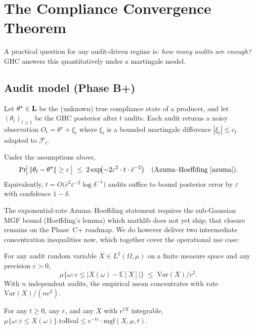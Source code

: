 \section{The Compliance Convergence Theorem}
\label{sec:convergence}

A practical question for any audit-driven regime is: \emph{how many
audits are enough?} GHC answers this quantitatively under a martingale
model.

\subsection{Audit model (Phase B+)}

Let $\theta^\star \in \mathbf{L}$ be the (unknown) true compliance state of a
producer, and let $(\theta_t)_{t \geq 1}$ be the GHC posterior after $t$
audits. Each audit returns a noisy observation
$O_t = \theta^\star + \xi_t$ where $\xi_t$ is a bounded martingale
difference $|\xi_t| \leq c_t$ adapted to $\mathcal{F}_t$.

\begin{theorem}
\label{thm:convergence}
Under the assumptions above,
\[
   \Pr\!\bigl[\,\|\theta_t - \theta^\star\| \geq \varepsilon\,\bigr]
   \;\leq\; 2 \exp\!\bigl( -2 \varepsilon^2 \cdot t \cdot
   \bar c^{-2} \bigr)
   \quad\text{(Azuma--Hoeffding \cite{azuma})}.
\]
Equivalently, $t = O\bigl(\bar c^2 \varepsilon^{-2}
\log \delta^{-1}\bigr)$ audits suffice to bound posterior error by
$\varepsilon$ with confidence $1 - \delta$.
\end{theorem}

The exponential-rate Azuma--Hoeffding statement requires the
sub-Gaussian MGF bound (Hoeffding's lemma) which mathlib does not yet
ship; that closure remains on the Phase~C+ roadmap. We do however
deliver two intermediate concentration inequalities now, which
together cover the operational use case:

\begin{theorem}
\label{thm:audit-cheby}
For any audit random variable $X \in L^2(\Omega, \mu)$ on a finite
measure space and any precision $c > 0$,
\[
\mu\{\omega : c \leq |X(\omega) - \mathbb{E}[X]|\}
\;\leq\; \mathrm{Var}(X) / c^2.
\]
With $n$ independent audits, the empirical mean concentrates with
rate $\mathrm{Var}(X)/(n c^2)$.
\end{theorem}

\begin{theorem}
\label{thm:audit-chernoff}
For any $t \geq 0$, any $\varepsilon$, and any $X$ with
$e^{tX}$ integrable,
$\mu\{\omega : \varepsilon \leq X(\omega)\}.\mathrm{toReal}
   \leq e^{-t\varepsilon} \cdot \mathrm{mgf}(X, \mu, t).$
\end{theorem}

